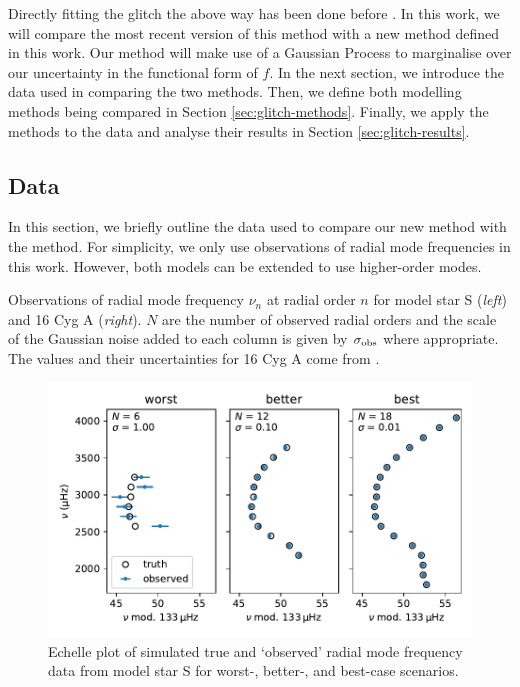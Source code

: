 
Directly fitting the glitch the above way has been done before \citep[e.g.][]{Verma.Faria.ea2014,Verma.Raodeo.ea2017}. In this work, we will compare the most recent version of this method \citep[][hereafter V19]{Verma.Raodeo.ea2019} with a new method defined in this work. Our method will make use of a Gaussian Process to marginalise over our uncertainty in the functional form of \(f\). In the next section, we introduce the data used in comparing the two methods. Then, we define both modelling methods being compared in Section \ref{sec:glitch-methods}. Finally, we apply the methods to the data and analyse their results in Section \ref{sec:glitch-results}.

\subsection{Data}\label{sec:glitch-data}

In this section, we briefly outline the data used to compare our new method with the  method. For simplicity, we only use observations of radial mode frequencies in this work. However, both models can be extended to use higher-order modes.

\begin{table}
    \centering
    \caption{Observations of radial mode frequency \(\nu_n\) at radial order \(n\) for model star S (\emph{left}) and 16 Cyg A (\emph{right}). \(N\) are the number of observed radial orders and the scale of the Gaussian noise added to each column is given by \(\sigma_{{\mathrm{obs}}}\) where appropriate. The values and their uncertainties for 16 Cyg A come from \citet{Lund.SilvaAguirre.ea2017}.}
    \label{tab:glitch-obs}
    
\end{table}

\begin{figure}
    \centering
    \includegraphics{figures/glitch-test-obs.pdf}
    \caption{Echelle plot of simulated true and `observed' radial mode frequency data from model star S for worst-, better-, and best-case scenarios.}
    \label{fig:glitch-test-obs}
\end{figure}

